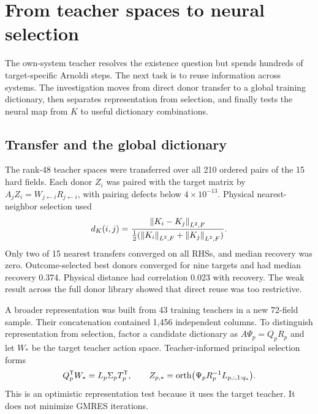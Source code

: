\section{From teacher spaces to neural selection}
\label{sec:family-representation}

The own-system teacher resolves the existence question but spends hundreds of target-specific Arnoldi steps. The next task is to reuse information across systems. The investigation moves from direct donor transfer to a global training dictionary, then separates representation from selection, and finally tests the neural map from $K$ to useful dictionary combinations.

\subsection{Transfer and the global dictionary}

The rank-48 teacher spaces were transferred over all 210 ordered pairs of the 15 hard fields. Each donor $Z_i$ was paired with the target matrix by $A_jZ_i=W_{j\leftarrow i}R_{j\leftarrow i}$, with pairing defects below $4\times10^{-13}$. Physical nearest-neighbor selection used
\begin{equation}
 d_K(i,j)=\frac{\left\lVert K_i-K_j\right\rVert_{L^2,F}}
 {\tfrac12(\left\lVert K_i\right\rVert_{L^2,F}+\left\lVert K_j\right\rVert_{L^2,F})}.
 \label{eq:physical-field-distance}
\end{equation}
Only two of 15 nearest transfers converged on all RHSs, and median recovery was zero. Outcome-selected best donors converged for nine targets and had median recovery 0.374. Physical distance had correlation 0.023 with recovery. The weak result across the full donor library showed that direct reuse was too restrictive.

A broader representation was built from 43 training teachers in a new 72-field sample. Their concatenation contained 1,456 independent columns. To distinguish representation from selection, factor a candidate dictionary as $A\Psi_p=Q_pR_p$ and let $W_*$ be the target teacher action space. Teacher-informed principal selection forms
\begin{equation}
 Q_p^{\mathsf T} W_*=L_p\Sigma_pT_p^{\mathsf T},
 \qquad
 Z_{p,*}=\operatorname{orth}\bigl(\Psi_pR_p^{-1}L_{p,:,1:q_*}\bigr).
 \label{eq:dictionary-ceiling}
\end{equation}
This is an optimistic representation test because it uses the target teacher. It does not minimize GMRES iterations.



